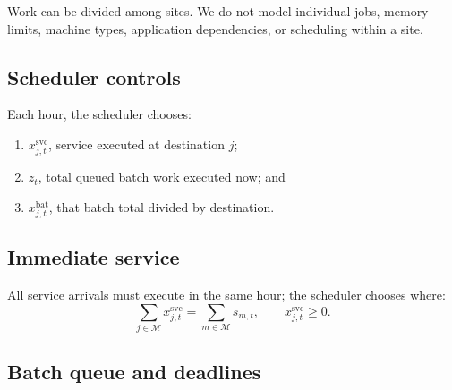 \documentclass[conference]{IEEEtran}
\begin{document}
Work can be divided among sites. We do not model individual jobs, memory
limits, machine types, application dependencies, or scheduling within a site.

\subsection{Scheduler controls}
\label{subsec:problem-decisions}

Each hour, the scheduler chooses:
\begin{enumerate}
  \item \(x^{\mathrm{svc}}_{j,t}\), service executed at destination \(j\);
  \item \(z_t\), total queued batch work executed now; and
  \item \(x^{\mathrm{bat}}_{j,t}\), that batch total divided by destination.
\end{enumerate}

\subsection{Immediate service}
\label{subsec:problem-service}

All service arrivals must execute in the same hour; the scheduler chooses
where:
\begin{equation}
  \sum_{j\in\mathcal M}x^{\mathrm{svc}}_{j,t}
  =
  \sum_{m\in\mathcal M}s_{m,t},
  \qquad
  x^{\mathrm{svc}}_{j,t}\geq0.
  \label{eq:service-conservation}
\end{equation}


\subsection{Batch queue and deadlines}
\label{subsec:problem-batch}
\end{document}
